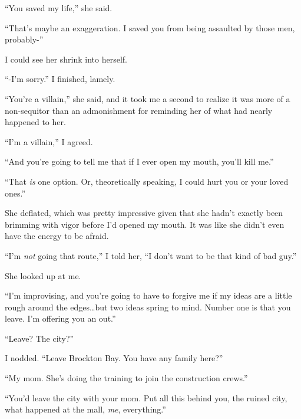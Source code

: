 ``You saved my life,'' she said.



``That's maybe an exaggeration.  I saved you from being assaulted by those men, probably-''



I could see her shrink into herself.



``-I'm sorry.''  I finished, lamely.



``You're a villain,'' she said, and it took me a second to realize it was more of a non-sequitor than an admonishment for reminding her of what had nearly happened to her.



``I'm a villain,'' I agreed.



``And you're going to tell me that if I ever open my mouth, you'll kill me.''



``That \emph{is} one option.  Or, theoretically speaking, I could hurt you or your loved ones.''



She deflated, which was pretty impressive given that she hadn't exactly been brimming with vigor before I'd opened my mouth.  It was like she didn't even have the energy to be afraid.



``I'm \emph{not} going that route,'' I told her, ``I don't want to be that kind of bad guy.''



She looked up at me.



``I'm improvising, and you're going to have to forgive me if my ideas are a little rough around the edges\ldots but two ideas spring to mind.  Number one is that you leave.  I'm offering you an out.''



``Leave?  The city?''



I nodded.  ``Leave Brockton Bay.  You have any family here?''



``My mom.  She's doing the training to join the construction crews.''



``You'd leave the city with your mom.  Put all this behind you, the ruined city, what happened at the mall, \emph{me}, everything.''




